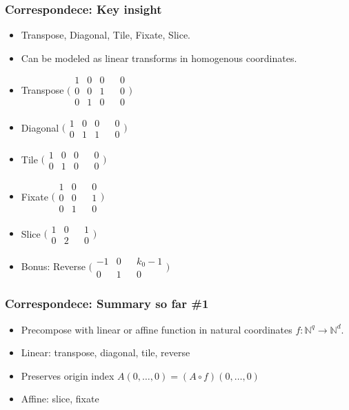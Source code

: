 \documentclass[xetex,mathserif,serif]{beamer}
\newcommand\Nat{\mathbb{N}}
\begin{document}
\begin{frame}
  \frametitle{Correspondece: Key insight}
  \pause
  \begin{itemize}[<+->]
    \item Transpose, Diagonal, Tile, Fixate, Slice.
    \item Can be modeled as linear transforms in homogenous coordinates.
    \item Transpose \(\bigg(\begin{smallmatrix} 1 & 0 & 0 && 0 \\ 0 & 0 & 1 && 0 \\ 0 & 1 & 0 && 0 \end{smallmatrix}\bigg)\)
    \item Diagonal \(\big(\begin{smallmatrix} 1 & 0 & 0 && 0 \\ 0 & 1 & 1 && 0 \end{smallmatrix}\big)\)
    \item Tile \(\big(\begin{smallmatrix} 1 & 0 & 0 && 0 \\ 0 & 1 & 0 && 0 \end{smallmatrix}\big)\)
    \item Fixate \(\bigg(\begin{smallmatrix} 1 & 0 && 0 \\ 0 & 0 && 1 \\ 0 & 1 && 0 \end{smallmatrix}\bigg)\)
    \item Slice \(\big(\begin{smallmatrix} 1 & 0 && 1 \\ 0 & 2 && 0 \end{smallmatrix}\big)\)
    \item Bonus: Reverse \(\big(\begin{smallmatrix} -1 & 0 && k_0-1 \\ 0 & 1 && 0 \end{smallmatrix}\big)\)
  \end{itemize}
\end{frame}

\begin{frame}
  \frametitle{Correspondece: Summary so far \#1}
  \pause
  \begin{itemize}[<+->]
    \item Precompose with linear or affine function in natural coordinates \(f : \Nat^q \to \Nat^d\).
    \item Linear: transpose, diagonal, tile, reverse
    \item Preserves origin index \(A(0, \dots, 0) = (A \circ f)(0, \dots, 0)\)
    \item Affine: slice, fixate
  \end{itemize}
\end{frame}
\end{document}
